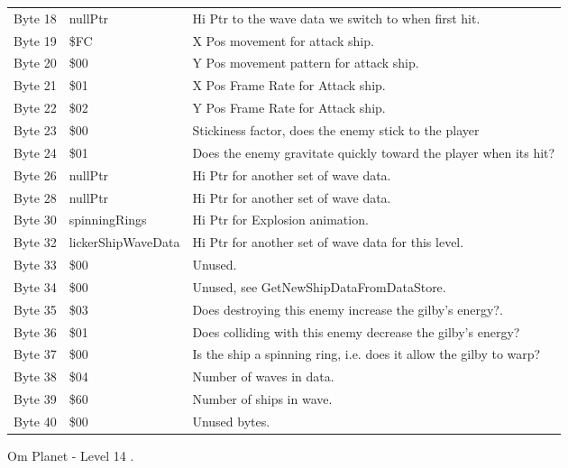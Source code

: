 \begin{figure}[H]
{\begin{adjustbox}{width=12cm}
\begin{tabular}{lll}
 Byte 18 & nullPtr            & Hi Ptr to the wave data we switch to when first hit.               \\
 Byte 19 & \$FC                & X Pos movement for attack ship.                                    \\
 Byte 20 & \$00                & Y Pos movement pattern for attack ship.                            \\
 Byte 21 & \$01                & X Pos Frame Rate for Attack ship.                                  \\
 Byte 22 & \$02                & Y Pos Frame Rate for Attack ship.                                  \\
 Byte 23 & \$00                & Stickiness factor, does the enemy stick to the player              \\
 Byte 24 & \$01                & Does the enemy gravitate quickly toward the player when its hit?   \\
 Byte 26 & nullPtr            & Hi Ptr for another set of wave data.                               \\
 Byte 28 & nullPtr            & Hi Ptr for another set of wave data.                               \\
 Byte 30 & spinningRings      & Hi Ptr for Explosion animation.                                    \\
 Byte 32 & lickerShipWaveData & Hi Ptr for another set of wave data for this level.                \\
 Byte 33 & \$00                & Unused.                                                            \\
 Byte 34 & \$00                & Unused, see GetNewShipDataFromDataStore.                           \\
 Byte 35 & \$03                & Does destroying this enemy increase the gilby's energy?.           \\
 Byte 36 & \$01                & Does colliding with this enemy decrease the gilby's energy?        \\
 Byte 37 & \$00                & Is the ship a spinning ring, i.e. does it allow the gilby to warp? \\
 Byte 38 & \$04                & Number of waves in data.                                           \\
 Byte 39 & \$60                & Number of ships in wave.                                           \\
 Byte 40 & \$00                & Unused bytes.                                                      \\
\bottomrule
\end{tabular}

  \end{adjustbox}

  }\caption*{Om Planet - Level 14
.}
\end{figure}

